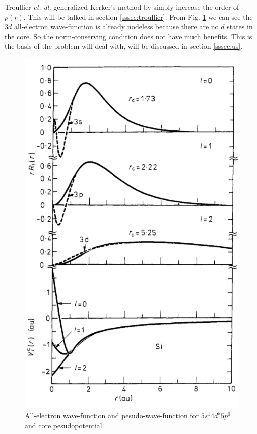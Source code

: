 Troullier \emph{et. al.} generalized Kerker's method by simply increase
the order of $p (r)$.\cite{troullier1990straightforward}
This will be talked in section \ref{sssec:troullier}.
From Fig. \ref{fig:kerkerfig1} we can see the $3d$ all-electron wave-function is
already nodeless because there are no $d$ states in the core.
So the norm-conserving condition does not have much benefits.
This is the basis of the problem \citeauthor{Vanderbilt:1990is} will deal with, will be discussed in section \ref{sssec:us}.

\begin{figure}[H]
	\centering
	\includegraphics[height=0.5\textheight]{images/kerkerfig1}
	\caption{All-electron wave-function and pesudo-wave-function for
		 $5s^1 4d^5 5p^0$ and core pesudopotential.\cite{Kerker:1980cs}}
	\label{fig:kerkerfig1}
\end{figure}














